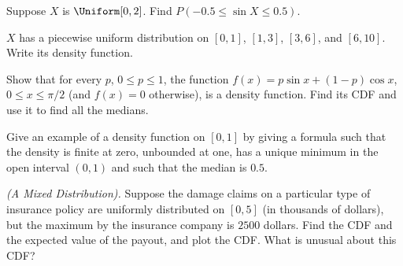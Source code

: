 \begin{problem}[Handout 12, \# 9]
  Suppose \(X\) is \(\Uniform[0,2]\). Find \(P(-0.5\leq \sin X\leq 0.5)\).
\end{problem}
\begin{solution}

\end{solution}
\newpage

\begin{problem}[Handout 12, \# 13]
  \(X\) has a piecewise uniform distribution on \([0,1]\), \([1,3]\),
  \([3,6]\), and \([6,10]\). Write its density function.
\end{problem}
\begin{solution}

\end{solution}
\newpage

\begin{problem}[Handout 12, \# 16]
  Show that for every \(p\), \(0\leq p\leq 1\), the function \(f(x)=p\sin
  x+(1-p)\cos x\), \(0\leq x\leq\pi/2\) (and \(f(x)=0\) otherwise), is a
  density function. Find its CDF and use it to find all the medians.
\end{problem}
\begin{solution}

\end{solution}
\newpage

\begin{problem}[Handout 12, \# 17]
  Give an example of a density function on \([0,1]\) by giving a formula
  such that the density is finite at zero, unbounded at one, has a unique
  minimum in the open interval \((0,1)\) and such that the median is
  \(0.5\).
\end{problem}
\begin{solution}

\end{solution}
\newpage

\begin{problem}[Handout 12, \# 18]
  \emph{(A Mixed Distribution).} Suppose the damage claims on a particular
  type of insurance policy are uniformly distributed on \([0,5]\) (in
  thousands of dollars), but the maximum by the insurance company is
  \(2500\) dollars. Find the CDF and the expected value of the payout, and
  plot the CDF. What is unusual about this CDF?
\end{problem}
\begin{solution}

\end{solution}
\newpage

